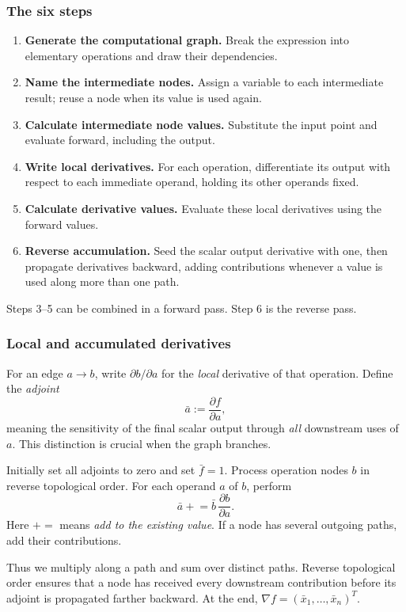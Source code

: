 \subsubsection*{The six steps}
\begin{enumerate}
\item \textbf{Generate the computational graph.} Break the expression into elementary operations and draw their dependencies.
\item \textbf{Name the intermediate nodes.} Assign a variable to each intermediate result; reuse a node when its value is used again.
\item \textbf{Calculate intermediate node values.} Substitute the input point and evaluate forward, including the output.
\item \textbf{Write local derivatives.} For each operation, differentiate its output with respect to each immediate operand, holding its other operands fixed.
\item \textbf{Calculate derivative values.} Evaluate these local derivatives using the forward values.
\item \textbf{Reverse accumulation.} Seed the scalar output derivative with one, then propagate derivatives backward, adding contributions whenever a value is used along more than one path.
\end{enumerate}
Steps 3--5 can be combined in a forward pass. Step 6 is the reverse pass.

\subsubsection*{Local and accumulated derivatives}
For an edge $a\to b$, write $\partial b/\partial a$ for the \emph{local} derivative of that operation. Define the \emph{adjoint}
\[
 \bar a:=\frac{\partial f}{\partial a},
\]
meaning the sensitivity of the final scalar output through \emph{all} downstream uses of $a$. This distinction is crucial when the graph branches.

Initially set all adjoints to zero and set $\bar f=1$. Process operation nodes $b$ in reverse topological order. For each operand $a$ of $b$, perform
\begin{equation}
 \boxed{\bar a\mathrel{+}=\bar b\,\frac{\partial b}{\partial a}.}
 \label{eq:lec08-update}
\end{equation}
Here $+=$ means \emph{add to the existing value}. If a node has several outgoing paths, add their contributions.

Thus we multiply along a path and sum over distinct paths. Reverse topological order ensures that a node has received every downstream contribution before its adjoint is propagated farther backward. At the end, $\nabla f=(\bar x_1,\ldots,\bar x_n)^T$.

